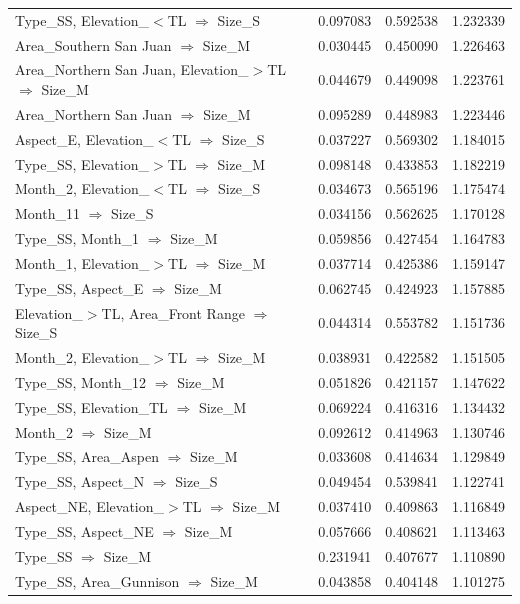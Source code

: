\begin{tabular}{lrrr}
Type\_SS, Elevation\_$<$TL $\Rightarrow$ Size\_S & 0.097083 & 0.592538 & 1.232339 \\
Area\_Southern San Juan $\Rightarrow$ Size\_M & 0.030445 & 0.450090 & 1.226463 \\
Area\_Northern San Juan, Elevation\_$>$TL $\Rightarrow$ Size\_M & 0.044679 & 0.449098 & 1.223761 \\
Area\_Northern San Juan $\Rightarrow$ Size\_M & 0.095289 & 0.448983 & 1.223446 \\
Aspect\_E, Elevation\_$<$TL $\Rightarrow$ Size\_S & 0.037227 & 0.569302 & 1.184015 \\
Type\_SS, Elevation\_$>$TL $\Rightarrow$ Size\_M & 0.098148 & 0.433853 & 1.182219 \\
Month\_2, Elevation\_$<$TL $\Rightarrow$ Size\_S & 0.034673 & 0.565196 & 1.175474 \\
Month\_11 $\Rightarrow$ Size\_S & 0.034156 & 0.562625 & 1.170128 \\
Type\_SS, Month\_1 $\Rightarrow$ Size\_M & 0.059856 & 0.427454 & 1.164783 \\
Month\_1, Elevation\_$>$TL $\Rightarrow$ Size\_M & 0.037714 & 0.425386 & 1.159147 \\
Type\_SS, Aspect\_E $\Rightarrow$ Size\_M & 0.062745 & 0.424923 & 1.157885 \\
Elevation\_$>$TL, Area\_Front Range $\Rightarrow$ Size\_S & 0.044314 & 0.553782 & 1.151736 \\
Month\_2, Elevation\_$>$TL $\Rightarrow$ Size\_M & 0.038931 & 0.422582 & 1.151505 \\
Type\_SS, Month\_12 $\Rightarrow$ Size\_M & 0.051826 & 0.421157 & 1.147622 \\
Type\_SS, Elevation\_TL $\Rightarrow$ Size\_M & 0.069224 & 0.416316 & 1.134432 \\
Month\_2 $\Rightarrow$ Size\_M & 0.092612 & 0.414963 & 1.130746 \\
Type\_SS, Area\_Aspen $\Rightarrow$ Size\_M & 0.033608 & 0.414634 & 1.129849 \\
Type\_SS, Aspect\_N $\Rightarrow$ Size\_S & 0.049454 & 0.539841 & 1.122741 \\
Aspect\_NE, Elevation\_$>$TL $\Rightarrow$ Size\_M & 0.037410 & 0.409863 & 1.116849 \\
Type\_SS, Aspect\_NE $\Rightarrow$ Size\_M & 0.057666 & 0.408621 & 1.113463 \\
Type\_SS $\Rightarrow$ Size\_M & 0.231941 & 0.407677 & 1.110890 \\
Type\_SS, Area\_Gunnison $\Rightarrow$ Size\_M & 0.043858 & 0.404148 & 1.101275 \\

\end{tabular}
